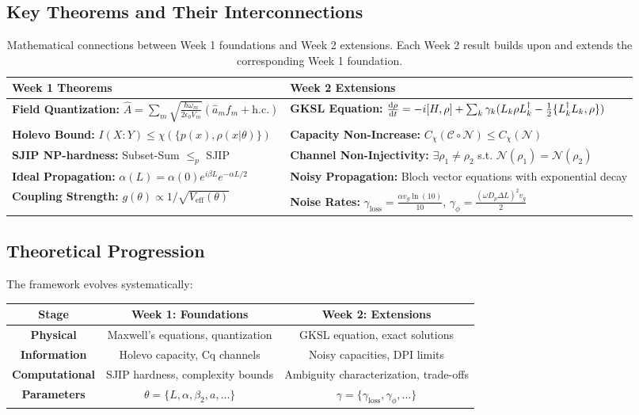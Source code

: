 \documentclass[12pt,a4paper]{article}
\begin{document}
\subsection{Key Theorems and Their Interconnections}
\begin{table}[h!]
    \centering
    \begin{tabular}{p{} p{}}
        \toprule
        \textbf{Week 1 Theorems} & \textbf{Week 2 Extensions} \\
        \midrule
        \textbf{Field Quantization:} $\hat{A} = \sum_m \sqrt{\frac{\hbar\omega_m}{2\epsilon_0 V_m}} (\hat{a}_m f_m + \text{h.c.})$ & \textbf{GKSL Equation:} $\dv{\rho}{t} = -i[H,\rho] + \sum_k \gamma_k (L_k \rho L_k^\dagger - \frac{1}{2}\{L_k^\dagger L_k, \rho\})$ \\
        \textbf{Holevo Bound:} $I(X:Y) \leq \chi(\{p(x), \rho(x|\theta)\})$ & \textbf{Capacity Non-Increase:} $C_\chi(\mathcal{C} \circ \mathcal{N}) \leq C_\chi(\mathcal{N})$ \\
        \textbf{SJIP NP-hardness:} Subset-Sum $\leq_p$ SJIP & \textbf{Channel Non-Injectivity:} $\exists \rho_1 \neq \rho_2$ s.t. $\mathcal{N}(\rho_1) = \mathcal{N}(\rho_2)$ \\
        \textbf{Ideal Propagation:} $\alpha(L) = \alpha(0)e^{i\beta L}e^{-\alpha L/2}$ & \textbf{Noisy Propagation:} Bloch vector equations with exponential decay \\
        \textbf{Coupling Strength:} $g(\theta) \propto 1/\sqrt{V_{\text{eff}}(\theta)}$ & \textbf{Noise Rates:} $\gamma_{\text{loss}} = \frac{\alpha v_g \ln(10)}{10}$, $\gamma_\phi = \frac{(\omega D_p \Delta L)^2 v_g}{2}$ \\
        \bottomrule
    \end{tabular}
    \caption{Mathematical connections between Week 1 foundations and Week 2 extensions. Each Week 2 result builds upon and extends the corresponding Week 1 foundation.}
    \label{tab:theorem_connections}
\end{table}

\subsection{Theoretical Progression}
The framework evolves systematically:

\begin{center}
\begin{tabular}{|c|c|c|}
\hline
\textbf{Stage} & \textbf{Week 1: Foundations} & \textbf{Week 2: Extensions} \\
\hline
\textbf{Physical} & Maxwell's equations, quantization & GKSL equation, exact solutions \\
\hline
\textbf{Information} & Holevo capacity, Cq channels & Noisy capacities, DPI limits \\
\hline
\textbf{Computational} & SJIP hardness, complexity bounds & Ambiguity characterization, trade-offs \\
\hline
\textbf{Parameters} & $\theta = \{L,\alpha,\beta_2,a,\ldots\}$ & $\gamma = \{\gamma_{\text{loss}},\gamma_\phi,\ldots\}$ \\
\hline
\end{tabular}
\end{center}
\end{document}
